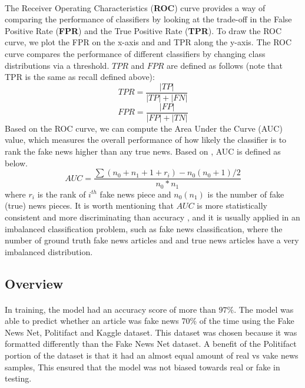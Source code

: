 \documentclass[11.5pt]{article}
\begin{document}
\begin{multicols}{2}
\paragraph{}
The Receiver Operating Characteristics (\textbf{ROC}) curve provides a way of comparing the performance of classiﬁers by looking at the trade-oﬀ in the False Positive Rate (\textbf{FPR}) and the True Positive Rate (\textbf{TPR}). To draw the ROC curve, we plot the FPR on the x-axis and and TPR along the y-axis. The ROC curve compares the performance of diﬀerent classiﬁers by changing class distributions via a threshold. $TPR$ and $FPR$ are deﬁned as follows (note that TPR is the same as recall deﬁned above):
\begin{equation}
    TPR = \frac{|TP|}{|TP|+|FN|}
\end{equation}
\begin{equation}
    FPR = \frac{|FP|}{|FP|+|TN|}
\end{equation}
Based on the ROC curve, we can compute the Area Under the Curve (AUC) value, which measures the overall performance of how likely the classiﬁer is to rank the fake news higher than any true news. Based on \cite{roc}, AUC is deﬁned as below.
\begin{equation}
    AUC = \frac{\sum (n_0 + n_1 + 1 + r_i) - n_0 (n_0 + 1)/2}{n_0 * n_1}
\end{equation}
where $r_i$ is the rank of $i^{th}$ fake news piece and $n_0 (n_1)$ is the number of fake (true) news pieces. It is worth mentioning that $AUC$ is more statistically consistent and more discriminating than accuracy \cite{stat_accuracy}, and it is usually applied in an imbalanced classiﬁcation problem, such as fake news classiﬁcation, where the number of ground truth fake news articles and and true news articles have a very imbalanced distribution.

\subsection{Overview}
\paragraph{}
In training, the model had an accuracy score of more than $97\%$. The model was able to predict whether an article was fake news 70\% of the time using the Fake News Net, Politifact and Kaggle dataset.
This dataset was chosen because it was formatted differently than the Fake News Net dataset. A beneﬁt of the Politifact portion of the dataset is that it had an almost equal amount of real vs vake news samples, This ensured that the model was not biased towards real or fake in testing.


\end{multicols}
\end{document}
